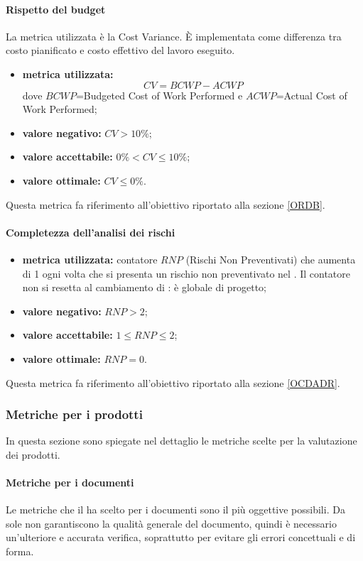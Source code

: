 				\paragraph{Rispetto del budget}
				\label{MRDB}
				La metrica utilizzata è la Cost Variance. È implementata come differenza tra costo pianificato e costo effettivo del lavoro eseguito.
				\begin{itemize}
					\item \textbf{metrica utilizzata:} $$CV = BCWP-ACWP$$
					dove $BCWP$=Budgeted Cost of Work Performed e $ACWP$=Actual Cost of Work Performed;
					\item \textbf{valore negativo:} $CV>10\%$;
					\item \textbf{valore accettabile:} $0\%<CV\leq 10\%$;
					\item \textbf{valore ottimale:} $CV\leq 0\%$.
				\end{itemize}
				Questa metrica fa riferimento all'obiettivo riportato alla sezione \ref{ORDB}.
			
			\paragraph{Completezza dell'analisi dei rischi}
			\label{MCDADR}
			\begin{itemize}
				\item \textbf{metrica utilizzata:} contatore $RNP$ (Rischi Non Preventivati) che aumenta di 1 ogni volta che si presenta un rischio non preventivato nel \pdpv. Il contatore non si resetta al cambiamento di  : è globale di progetto;
				\item \textbf{valore negativo:} $RNP>2$;
				\item \textbf{valore accettabile:} $1\leq RNP\leq 2$;
				\item \textbf{valore ottimale:} $RNP=0$.
			\end{itemize}
			Questa metrica fa riferimento all'obiettivo riportato alla sezione \ref{OCDADR}.
			
		\subsubsection{Metriche per i prodotti}
		In questa sezione sono spiegate nel dettaglio le metriche scelte per la valutazione dei prodotti.
			
			\paragraph{Metriche per i documenti}
			Le metriche che il  ha scelto per i documenti sono il più oggettive possibili. Da sole non garantiscono la qualità generale del documento, quindi è necessario un'ulteriore e accurata verifica, soprattutto per evitare gli errori concettuali e di forma.
			
